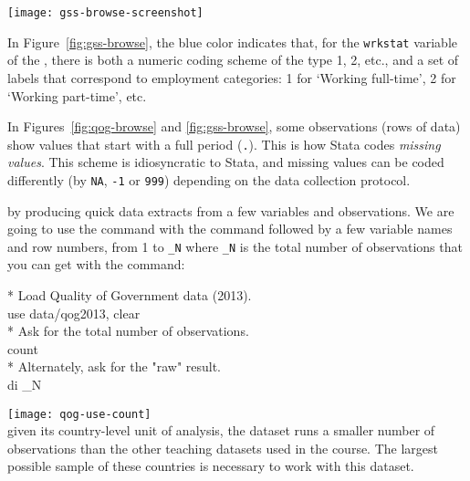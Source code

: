 		\begin{figure*}[h]
			\texttt{[image: gss-browse-screenshot]}%
		  \caption{The Data Editor in Browse (read-only) mode, showing \GSS data.}%
		  \label{fig:gss-browse}%
		\end{figure*}

	In Figure~\ref{fig:gss-browse}, the blue color indicates that, for the \texttt{wrkstat} variable of the \gss, there is both a numeric coding scheme of the type 1, 2, etc., and a set of labels that correspond to employment categories: 1 for `Working full-time', 2 for `Working part-time', etc.%

	In Figures~\ref{fig:qog-browse} and \ref{fig:gss-browse}, some observations (rows of data) show values that start with a full period (\texttt{.}). This is how Stata codes \emph{missing values}. This scheme is idiosyncratic to Stata, and missing values can be coded differently (\eg by \texttt{NA}, \texttt{-1} or \texttt{999}) depending on the data collection protocol.%

	 by producing quick data extracts from a few variables and observations. We are going to use the  command with the  command followed by a few variable names and row numbers, from 1 to \texttt{\_N} where \texttt{\_N} is the total number of observations that you can get with the  command:%

		\begin{docspec}
			* Load Quality of Government data (2013).\\
			use data/qog2013, clear\\[1em]
	
			* Ask for the total number of observations.\\
			count\\[1em]
	
			* Alternately, ask for the "raw" result.\\
			di \_N
		\end{docspec}

		\texttt{[image: qog-use-count]}\\[1em]


   given its country-level unit of analysis, the \QOG dataset runs a smaller number of observations than the other teaching datasets used in the course. The largest possible sample of these countries is necessary to work with this dataset.%

